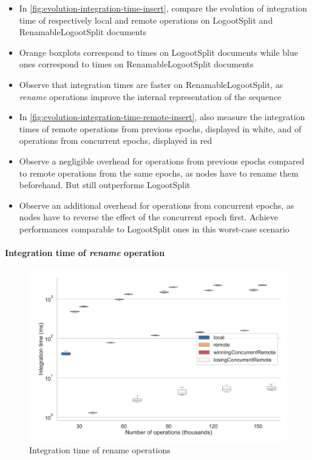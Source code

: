 \documentclass[sigplan,10pt]{acmart}
\begin{document}
\begin{itemize}
    \item In \autoref{fig:evolution-integration-time-insert}, compare the evolution of integration time of respectively local and remote operations on LogootSplit and RenamableLogootSplit documents
    \item Orange boxplots correspond to times on LogootSplit documents while blue ones correspond to times on RenamableLogootSplit documents
    \item Observe that integration times are faster on RenamableLogootSplit, as \emph{rename} operations improve the internal representation of the sequence
    \item In \autoref{fig:evolution-integration-time-remote-insert}, also measure the integration times of remote operations from previous epochs, displayed in white, and of operations from concurrent epochs, displayed in red
    \item Observe a negligible overhead for operations from previous epochs compared to remote operations from the same epochs, as nodes have to rename them beforehand. But still outperforms LogootSplit
    \item Observe an additional overhead for operations from concurrent epochs, as nodes have to reverse the effect of the concurrent epoch first. Achieve performances comparable to LogootSplit ones in this worst-case scenario
\end{itemize}

\paragraph{Integration time of \emph{rename} operation}

\begin{figure}[ht!]
    \centering
    \includegraphics[width=\columnwidth]{img/integration-time-boxplot-rename-op-without-outliers.pdf}
    \caption{Integration time of rename operations}
    \label{fig:evolution-integration-time-rename}
\end{figure}
\end{document}
